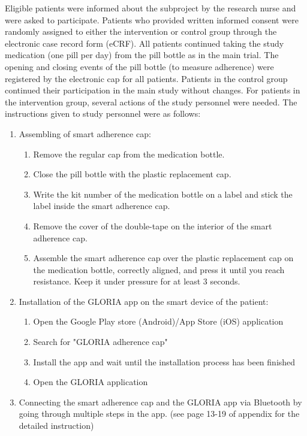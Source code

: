 \documentclass[twocolumn, serif, empirical, authordate]{jote-article}
\begin{document}
 Eligible patients were informed about the subproject by the research nurse and were asked to participate. Patients who provided written informed consent were randomly assigned to either the intervention or control group through the electronic case record form (eCRF). All patients continued taking the study medication (one pill per day) from the pill bottle as in the main trial. The opening and closing events of the pill bottle (to measure adherence) were registered by the electronic cap for all patients. Patients in the control group continued their participation in the main study without changes. For patients in the intervention group, several actions of the study personnel were needed.
 The instructions given to study personnel were as follows: 
\begin{enumerate}
\def\labelenumi{\arabic{enumi}.}
\item Assembling of smart adherence cap: \begin{enumerate}
 \def\labelenumii{\alph{enumii}.}
 \item Remove the regular cap from the medication bottle.
 \item Close the pill bottle with the plastic replacement cap.
 \item Write the kit number of the medication bottle on a label and stick the label inside the smart adherence cap.
 \item Remove the cover of the double-tape on the interior of the smart adherence cap.
 \item Assemble the smart adherence cap over the plastic replacement cap on the medication bottle, correctly aligned, and press it until you reach resistance. Keep it under pressure for at least 3 seconds.
 \end{enumerate}
\item Installation of the GLORIA app on the smart device of the patient: \begin{enumerate}
 \def\labelenumii{\alph{enumii}.}
 \item Open the Google Play store (Android)/App Store (iOS) application \item Search for "GLORIA adherence cap"
 \item Install the app and wait until the installation process has been finished \item Open the GLORIA application \end{enumerate}
\item Connecting the smart adherence cap and the GLORIA app via Bluetooth by going through multiple steps in the app. (see page 13-19 of appendix for the detailed instruction)
\end{enumerate}
\end{document}
